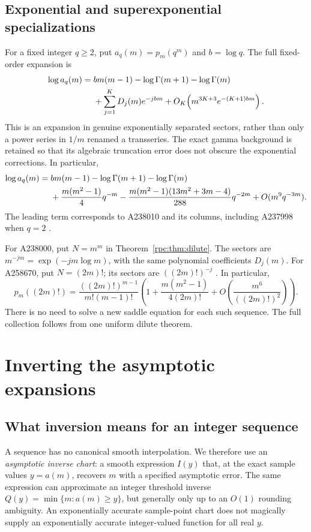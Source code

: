 \documentclass[11pt]{article}
\theoremstyle{definition}
\theoremstyle{remark}
\numberwithin{equation}{section}
\begin{document}
\subsection{Exponential and superexponential specializations}

For a fixed integer $q\ge2$, put $a_q(m)=p_m(q^m)$ and $b=\log q$.
The full fixed-order expansion is
\begin{align}\label{rpc:eq:exp-transseries}
 \log a_q(m)={}&b m(m-1)-\log\Gamma(m+1)-\log\Gamma(m)\notag\\
 &+\sum_{j=1}^K D_j(m)e^{-jbm}
      +O_K\!\left(m^{3K+3}e^{-(K+1)bm}\right).
\end{align}
This is an expansion in genuine exponentially separated sectors, rather than
only a power series in $1/m$ renamed a transseries. The exact gamma background
is retained so that its algebraic truncation error does not obscure the
exponential corrections. In particular,
\begin{align}\label{rpc:eq:exp-two}
 \log a_q(m)={}&b m(m-1)-\log\Gamma(m+1)-\log\Gamma(m)\notag\\
 &+\frac{m(m^2-1)}4q^{-m}
 -\frac{m(m^2-1)(13m^2+3m-4)}{288}q^{-2m}
 +O(m^9q^{-3m}).
\end{align}
The leading term corresponds to A238010 and its columns, including A237998
when $q=2$ \cite{oeis238010}.

For A238000, put $N=m^m$ in Theorem~\ref{rpc:thm:dilute}. The sectors are
$m^{-jm}=\exp(-jm\log m)$, with the same polynomial coefficients $D_j(m)$.
For A258670, put $N=(2m)!$; its sectors are $((2m)!)^{-j}$
\cite{oeis258670}. In particular,
\[
 p_m((2m)!)=\frac{((2m)!)^{m-1}}{m!(m-1)!}
 \left(1+\frac{m(m^2-1)}{4(2m)!}
       +O\left(\frac{m^6}{((2m)!)^2}\right)\right).
\]
There is no need to solve a new saddle equation for each such sequence.
The full collection follows from one uniform dilute theorem.

\section{Inverting the asymptotic expansions}\label{rpc:sec:inverse}

\subsection{What inversion means for an integer sequence}

A sequence has no canonical smooth interpolation. We therefore use an
\emph{asymptotic inverse chart}: a smooth expression $I(y)$ that, at the exact
sample values $y=a(m)$, recovers $m$ with a specified asymptotic error.
The same expression can approximate an integer threshold inverse
$Q(y)=\min\{m:a(m)\ge y\}$, but generally only up to an $O(1)$ rounding
ambiguity. An exponentially accurate sample-point chart does not magically
supply an exponentially accurate integer-valued function for all real $y$.
\end{document}
